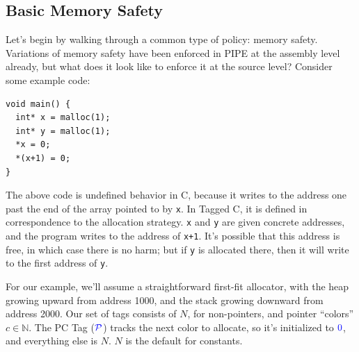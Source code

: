 \documentclass[acmsmall,review,anonymous]{acmart}\settopmatter{printfolios=true,printccs=false,printacmref=false}
\begin{document}
\subsection{Basic Memory Safety}
\label{sec:memsafe}

Let's begin by walking through a common type of policy: memory safety. Variations of memory safety
have been enforced in PIPE at the assembly level already, but what does it look like to enforce it
at the source level? Consider some example code:

\begin{verbatim}
void main() {
  int* x = malloc(1);
  int* y = malloc(1);
  *x = 0;
  *(x+1) = 0;
}
\end{verbatim}

The above code is undefined behavior in C, because it writes to the address one past the end
of the array pointed to by {\tt x}. In Tagged C, it is defined in correspondence to
the allocation strategy. {\tt x} and {\tt y} are given concrete addresses, and the program
writes to the address of {\tt x+1}. It's possible that this address is free, in which case
there is no harm; but if {\tt y} is allocated there, then it will write to the first address
of {\tt y}.

For our example, we'll assume a straightforward first-fit allocator, with the heap growing upward
from address 1000, and the stack growing downward from address 2000. Our set of tags consists of
\(N\), for non-pointers, and pointer ``colors'' \(c \in \mathbb{N}\). The PC Tag
(\(\mathcal{\color{blue} P}\)) tracks the next color to allocate, so it's initialized to \({\color{blue} 0}\), and everything else is \(N\).
\(N\) is the default for constants.

\end{document}
